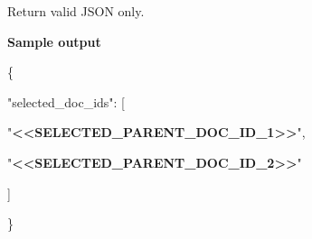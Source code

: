\begin{tcolorbox}
\begin{scriptsize}
Return valid JSON only.\par
\medskip
\normalfont\textbf{Sample output}\par
\ttfamily
\{\par
  "selected\_doc\_ids": [\par
    "\textcolor{my-green}{\textbf{\textless{}\textless{}SELECTED\_PARENT\_DOC\_ID\_1\textgreater{}\textgreater{}}}",\par
    "\textcolor{my-green}{\textbf{\textless{}\textless{}SELECTED\_PARENT\_DOC\_ID\_2\textgreater{}\textgreater{}}}"\par
  ]\par
\}\par
\end{scriptsize}
\end{tcolorbox}
